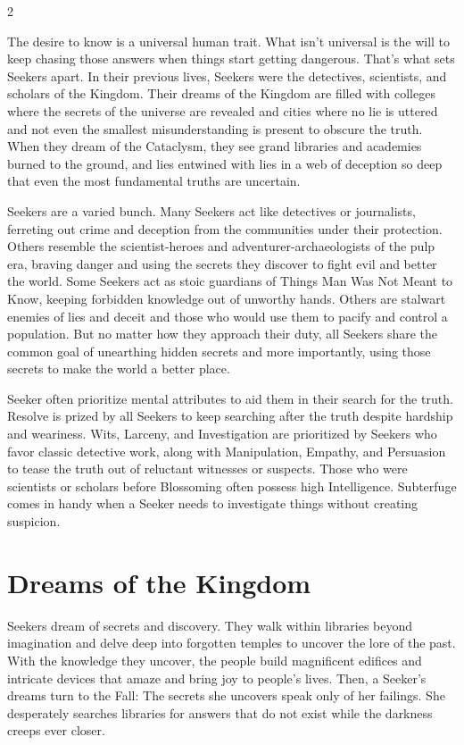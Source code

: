 \label{scha:Seeker}\begin{multicols}{2}\raggedcolumns

\noindent The desire to know is a universal human trait. What isn't universal is the will to keep chasing those answers when things start getting dangerous. That's what sets Seekers apart. In their previous lives, Seekers were the detectives, scientists, and scholars of the Kingdom. Their dreams of the Kingdom are filled with colleges where the secrets of the universe are revealed and cities where no lie is uttered and not even the smallest misunderstanding is present to obscure the truth. When they dream of the Cataclysm, they see grand libraries and academies burned to the ground, and lies entwined with lies in a web of deception so deep that even the most fundamental truths are uncertain.

Seekers are a varied bunch. Many Seekers act like detectives or journalists, ferreting out crime and deception from the communities under their protection. Others resemble the scientist-heroes and adventurer-archaeologists of the pulp era, braving danger and using the secrets they discover to fight evil and better the world. Some Seekers act as stoic guardians of Things Man Was Not Meant to Know, keeping forbidden knowledge out of unworthy hands. Others are stalwart enemies of lies and deceit and those who would use them to pacify and control a population. But no matter how they approach their duty, all Seekers share the common goal of unearthing hidden secrets and more importantly, using those secrets to make the world a better place.

Seeker often prioritize mental attributes to aid them in their search for the truth. Resolve is prized by all Seekers to keep searching after the truth despite hardship and weariness. Wits, Larceny, and Investigation are prioritized by Seekers who favor classic detective work, along with Manipulation, Empathy, and Persuasion to tease the truth out of reluctant witnesses or suspects. Those who were scientists or scholars before Blossoming often possess high Intelligence. Subterfuge comes in handy when a Seeker needs to investigate things without creating suspicion.

\section*{Dreams of the Kingdom}

Seekers dream of secrets and discovery. They walk within libraries beyond imagination and delve deep into forgotten temples to uncover the lore of the past. With the knowledge they uncover, the people build magnificent edifices and intricate devices that amaze and bring joy to people's lives. Then, a Seeker's dreams turn to the Fall: The secrets she uncovers speak only of her failings. She desperately searches libraries for answers that do not exist while the darkness creeps ever closer. 


\end{multicols}
